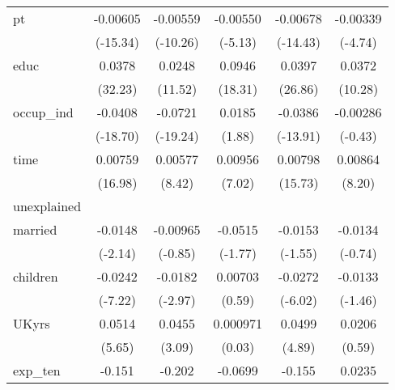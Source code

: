 {\begin{longtable}{l*{5}{c}}
pt          &    -0.00605\sym{***}&    -0.00559\sym{***}&    -0.00550\sym{***}&    -0.00678\sym{***}&    -0.00339\sym{***}\\
            &    (-15.34)         &    (-10.26)         &     (-5.13)         &    (-14.43)         &     (-4.74)         \\
educ        &      0.0378\sym{***}&      0.0248\sym{***}&      0.0946\sym{***}&      0.0397\sym{***}&      0.0372\sym{***}\\
            &     (32.23)         &     (11.52)         &     (18.31)         &     (26.86)         &     (10.28)         \\
occup\_ind   &     -0.0408\sym{***}&     -0.0721\sym{***}&      0.0185         &     -0.0386\sym{***}&    -0.00286         \\
            &    (-18.70)         &    (-19.24)         &      (1.88)         &    (-13.91)         &     (-0.43)         \\
time        &     0.00759\sym{***}&     0.00577\sym{***}&     0.00956\sym{***}&     0.00798\sym{***}&     0.00864\sym{***}\\
            &     (16.98)         &      (8.42)         &      (7.02)         &     (15.73)         &      (8.20)         \\
\hline
unexplained &                     &                     &                     &                     &                     \\
married     &     -0.0148\sym{*}  &    -0.00965         &     -0.0515         &     -0.0153         &     -0.0134         \\
            &     (-2.14)         &     (-0.85)         &     (-1.77)         &     (-1.55)         &     (-0.74)         \\
children    &     -0.0242\sym{***}&     -0.0182\sym{**} &     0.00703         &     -0.0272\sym{***}&     -0.0133         \\
            &     (-7.22)         &     (-2.97)         &      (0.59)         &     (-6.02)         &     (-1.46)         \\
UKyrs       &      0.0514\sym{***}&      0.0455\sym{**} &    0.000971         &      0.0499\sym{***}&      0.0206         \\
            &      (5.65)         &      (3.09)         &      (0.03)         &      (4.89)         &      (0.59)         \\
exp\_ten     &      -0.151\sym{***}&      -0.202\sym{***}&     -0.0699         &      -0.155\sym{***}&      0.0235         \\

\end{longtable}}
